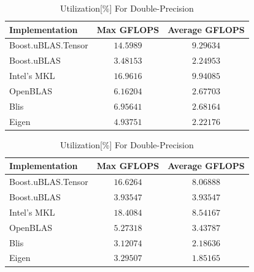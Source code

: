 \begin{table}[ht]
    \centering
    \caption{Utilization[\%] For Single-Precision}
    \begin{tabular}{|l|c|c|}
        \hline
        \textbf{Implementation} & \textbf{Max GFLOPS} & \textbf{Average GFLOPS}\\
        \hline
        Boost.uBLAS.Tensor  & $14.5989$ & $9.29634$ \\
        \hline
        Boost.uBLAS         & $3.48153$ & $2.24953$ \\
        \hline
        Intel's MKL         & $16.9616$ & $9.94085$ \\
        \hline
        OpenBLAS            & $6.16204$ & $2.67703$ \\
        \hline
        Blis                & $6.95641$ & $2.68164$ \\
        \hline
        Eigen               & $4.93751$ & $2.22176$ \\
        \hline
    \end{tabular}

    \vspace*{1 cm}

    \centering
    \caption{Utilization[\%] For Double-Precision}
    \begin{tabular}{|l|c|c|}
        \hline
        \textbf{Implementation} & \textbf{Max GFLOPS} & \textbf{Average GFLOPS}\\
        \hline
        Boost.uBLAS.Tensor  & $16.6264$ & $8.06888$ \\
        \hline
        Boost.uBLAS         & $3.93547$ & $3.93547$ \\
        \hline
        Intel's MKL         & $18.4084$ & $8.54167$ \\
        \hline
        OpenBLAS            & $5.27318$ & $3.43787$ \\
        \hline
        Blis                & $3.12074$ & $2.18636$ \\
        \hline
        Eigen               & $3.29507$ & $1.85165$ \\
        \hline
    \end{tabular}
\end{table}

